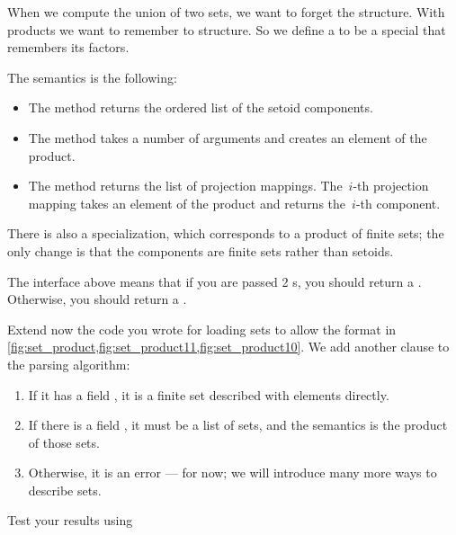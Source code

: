 
When we compute the union of two sets, we want to forget the structure.
With products we want to remember to structure.
So we define a  to be a special \Setoid that remembers its factors.


The semantics is the following:
\begin{itemize}
    \item The method  returns the ordered list of the setoid components.
    \item The method  takes a number of arguments and creates an element of the product.
    \item The method  returns the list of projection mappings.
          The~$i$-th projection mapping takes an element of the product and returns the~$i$-th component.
\end{itemize}

There is also a specialization, which corresponds to a product of finite sets; the only change is that the components are finite sets rather than setoids.



The interface above means that if you are passed 2 \FiniteSet{}s, you should return a \FiniteSet.
Otherwise, you should return a \Setoid.


%

%

\begin{codeexercise}
    Extend now the code you wrote for loading sets to allow the format in \cref{fig:set_product,fig:set_product11,fig:set_product10}.
    We add another clause to the parsing algorithm:
    \begin{enumerate}
        \item If it has a field , it is a finite set described with elements directly.
        \item If there is a field , it must be a list of sets, and the semantics is the product of those sets.
        \item Otherwise, it is an error --- for now; we will introduce many more ways to describe sets.
    \end{enumerate}
    Test your results using
\end{codeexercise}
